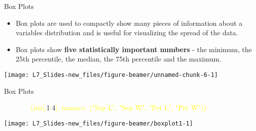 \documentclass[ignorenonframetext,]{beamer}
\newenvironment{Shaded}{\begin{snugshade}}{\end{snugshade}}
\newcommand{\KeywordTok}[1]{\textcolor{white}{\textbf{{#1}}}}
\newcommand{\NormalTok}[1]{\textcolor{yellow}{{#1}}}
\newcommand{\DataTypeTok}[1]{\textcolor{yellow}{{#1}}}
\newcommand{\DecValTok}[1]{\textcolor{numbercolor}{{#1}}}
\newcommand{\StringTok}[1]{\textcolor{yellow}{{#1}}}
\begin{document}
\begin{frame}[fragile]{Box Plots}

\begin{itemize}
\item
  Box plots are used to compactly show many pieces of information about
  a variables distribution and is useful for visualizing the spread of
  the data.
\item
  Box plots show \textbf{five statistically important numbers} - the
  minimum, the 25th percentile, the median, the 75th percentile and the
  maximum.
\end{itemize}

\small

\begin{Shaded}
\end{Shaded}

\begin{center}\texttt{[image: L7\_Slides-new\_files/figure-beamer/unnamed-chunk-6-1]} \end{center}

\vfill

\end{frame}

\begin{frame}[fragile]{Box Plots}

\small

\begin{Shaded}
\begin{Highlighting}[]
\KeywordTok{boxplot}\NormalTok{(iris[,}\DecValTok{1}\NormalTok{:}\DecValTok{4}\NormalTok{], }
        \DataTypeTok{names=}\KeywordTok{c}\NormalTok{(}\StringTok{"Sep L"}\NormalTok{, }\StringTok{"Sep W"}\NormalTok{, }\StringTok{"Pet L"}\NormalTok{, }\StringTok{"Pet W"}\NormalTok{))}
\end{Highlighting}
\end{Shaded}

\begin{center}\texttt{[image: L7\_Slides-new\_files/figure-beamer/boxplot1-1]} \end{center}

\end{frame}
\end{document}
